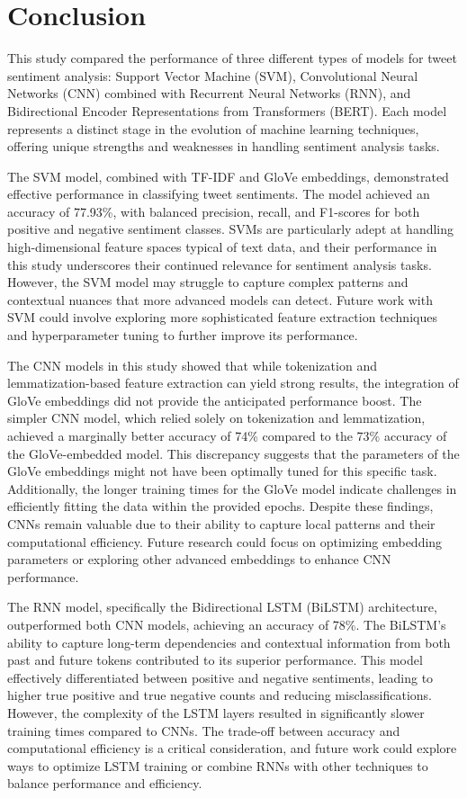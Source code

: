 \documentclass[12pt]{article}
\begin{document}
\section{Conclusion}
This study compared the performance of three different types of models for tweet sentiment analysis: Support Vector Machine (SVM), Convolutional Neural Networks (CNN) combined with Recurrent Neural Networks (RNN), and Bidirectional Encoder Representations from Transformers (BERT). Each model represents a distinct stage in the evolution of machine learning techniques, offering unique strengths and weaknesses in handling sentiment analysis tasks.

The SVM model, combined with TF-IDF and GloVe embeddings, demonstrated effective performance in classifying tweet sentiments. The model achieved an accuracy of 77.93\%, with balanced precision, recall, and F1-scores for both positive and negative sentiment classes. SVMs are particularly adept at handling high-dimensional feature spaces typical of text data, and their performance in this study underscores their continued relevance for sentiment analysis tasks. However, the SVM model may struggle to capture complex patterns and contextual nuances that more advanced models can detect. Future work with SVM could involve exploring more sophisticated feature extraction techniques and hyperparameter tuning to further improve its performance.

The CNN models in this study showed that while tokenization and lemmatization-based feature extraction can yield strong results, the integration of GloVe embeddings did not provide the anticipated performance boost. The simpler CNN model, which relied solely on tokenization and lemmatization, achieved a marginally better accuracy of 74\% compared to the 73\% accuracy of the GloVe-embedded model. This discrepancy suggests that the parameters of the GloVe embeddings might not have been optimally tuned for this specific task. Additionally, the longer training times for the GloVe model indicate challenges in efficiently fitting the data within the provided epochs. Despite these findings, CNNs remain valuable due to their ability to capture local patterns and their computational efficiency. Future research could focus on optimizing embedding parameters or exploring other advanced embeddings to enhance CNN performance.

The RNN model, specifically the Bidirectional LSTM (BiLSTM) architecture, outperformed both CNN models, achieving an accuracy of 78\%. The BiLSTM's ability to capture long-term dependencies and contextual information from both past and future tokens contributed to its superior performance. This model effectively differentiated between positive and negative sentiments, leading to higher true positive and true negative counts and reducing misclassifications. However, the complexity of the LSTM layers resulted in significantly slower training times compared to CNNs. The trade-off between accuracy and computational efficiency is a critical consideration, and future work could explore ways to optimize LSTM training or combine RNNs with other techniques to balance performance and efficiency.
\end{document}

